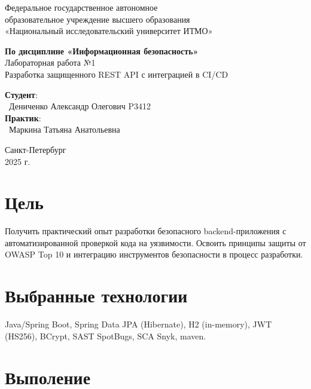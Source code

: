 \documentclass{article}
\begin{document}
\begin{center}
    \Large
    Федеральное государственное автономное \\
    образовательное учреждение высшего образования \\ 
    «Национальный исследовательский университет ИТМО»\\
    \vspace{0.5cm}
    \large
    
    \vspace{1cm}
    \Large
    \textbf{По дисциплине «Информационная безопасность»} \\
        Лабораторная работа №1\\
        Разработка защищенного REST API с
интеграцией в CI/CD
    \large
    \vspace{8cm}

    \begin{minipage}{.33\textwidth}
    \end{minipage}
    \hfill
    \begin{minipage}{.4\textwidth}
    
        \textbf{Студент}: \vspace{.1cm} \\
        \ Дениченко Александр Олегович P3412\\
        \textbf{Практик}:  \\
        \ Маркина Татьяна Анатольевна
    \end{minipage}
    \vfill
Санкт-Петербург\\ 2025 г.
\end{center}
\pagestyle{empty}
\newpage
\pagestyle{plain}

\section*{Цель}

Получить практический опыт разработки безопасного backend-приложения с
автоматизированной проверкой кода на уязвимости. Освоить принципы защиты от OWASP Top 10 и
интеграцию инструментов безопасности в процесс разработки.
\section*{Выбранные технологии}
Java/Spring Boot, Spring Data JPA (Hibernate), H2 (in-memory), JWT (HS256), BCrypt, SAST SpotBugs, SCA Snyk, maven.

\section*{Выполение}
\end{document}
